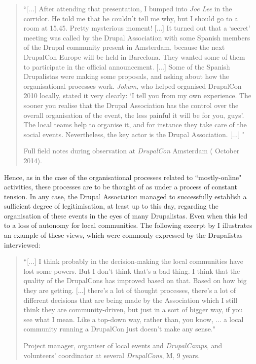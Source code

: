 \begin{quotation}
``[...] After attending that presentation, I bumped into \textit{Joe Lee} in the corridor. He told me that he couldn't tell me why, but I should go to a room at 15.45. Pretty mysterious moment! [...] It turned out that a `secret' meeting was called by the Drupal Association with some Spanish members of the Drupal community present in Amsterdam, because the next DrupalCon Europe will be held in Barcelona. They wanted some of them to participate in the official announcement. [...] Some of the Spanish Drupalistas were making some proposals, and asking about how the organisational processes work. \textit{Jokum}, who helped organised DrupalCon 2010 locally, stated it very clearly: `I tell you from my own experience. The sooner you realise that the Drupal Association has the control over the overall organisation of the event, the less painful it will be for you, guys'. The local teams help to organise it, and for instance they take care of the social events. Nevertheless, the key actor is the Drupal Association. [...] "

\begin{flushright}\footnotesize{Full field notes during observation at \textit{DrupalCon} Amsterdam ( October 2014).}\end{flushright}
\end{quotation}

Hence, as in the case of the organisational processes related to ``mostly-online" activities, these processes are to be thought of as under a process of constant tension. In any case, the Drupal Association managed to successfully establish a sufficient degree of legitimisation, at least up to this day, regarding the organisation of these events in the eyes of many Drupalistas. Even when this led to a loss of autonomy for local communities. The following excerpt by I illustrates an example of these views, which were commonly expressed by the Drupalistas interviewed:

\begin{quotation}
``[...] I think probably in the decision-making the local communities have lost some powers. But I don't think that's a bad thing. I think that the quality of the DrupalCons has improved based on that. Based on how big they are getting. [...]  there's a lot of thought processes, there's a lot of different decisions that are being made by the Association which I still think they are community-driven, but just in a sort of bigger way, if you see what I mean. Like a top-down way, rather than, you know, ... a local community running a DrupalCon just doesn't make any sense."

\begin{flushright}\footnotesize{Project manager, organiser of local events and \textit{DrupalCamps}, and volunteers' coordinator at several \textit{DrupalCons}, M, 9 years.}\end{flushright}
\end{quotation}

